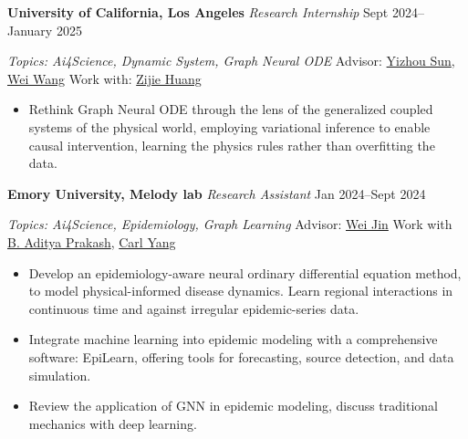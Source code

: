 \textbf{University of California, Los Angeles} \textit{Research Internship} \hfill Sept 2024--January 2025\par  

\textit{Topics: Ai4Science, Dynamic System, Graph Neural ODE} \hfill Advisor:  \href{https://scholar.google.com/citations?hl=en&user=TQgOjK0AAAAJ}{Yizhou Sun}, \href{https://scholar.google.com/citations?view_op=list_works&hl=en&hl=en&user=UedS9LQAAAAJ}{Wei Wang} Work with:  \href{https://scholar.google.com/citations?user=SejA1zsAAAAJ&hl=en}{Zijie Huang}\par
\begin{itemize}
        \item Rethink Graph Neural ODE through the lens of the generalized coupled systems of the physical world, employing variational inference to enable causal intervention, learning the physics rules rather than overfitting the data.
\end{itemize}\par

\textbf{Emory University, Melody lab} \textit{Research Assistant} \hfill Jan 2024--Sept 2024\par  

\textit{Topics: Ai4Science, Epidemiology, Graph Learning} \hfill Advisor:  \href{https://scholar.google.com/citations?user=eWow24EAAAAJ&hl=en&oi=ao}{Wei Jin} Work with \href{https://scholar.google.com/citations?user=C-NftTgAAAAJ}{B. Aditya Prakash}, \href{https://scholar.google.com/citations?user=mOINlwcAAAAJ&hl=en}{Carl Yang}\par
\begin{itemize}
        \item Develop an epidemiology-aware neural ordinary differential equation method, to model physical-informed disease dynamics. Learn regional interactions in continuous time and against irregular epidemic-series data.
        \item Integrate machine learning into epidemic modeling with a comprehensive software: EpiLearn, offering tools for forecasting, source detection, and data simulation.
        \item Review the application of GNN in epidemic modeling, discuss traditional mechanics with deep learning.
\end{itemize}\par




